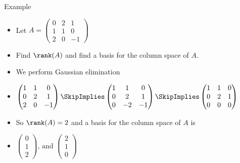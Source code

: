 \documentclass{beamer}
\begin{document}

\begin{frame}{Example}

\begin{itemize}
\item Let $A=
\begin{pmatrix}
0 & 2 & 1 \\
1 & 1 & 0 \\
2 & 0 & -1
\end{pmatrix}
$
\item Find $\rank(A)$ and find a basis for the column space of $A$.
\item We perform Gaussian elimination
\item $
\begin{pmatrix}
1 & 1 & 0 \\
0 & 2 & 1 \\
2 & 0 & -1
\end{pmatrix}
\SkipImplies
\begin{pmatrix}
1 & 1 & 0 \\
0 & 2 & 1 \\
0 & -2 & -1
\end{pmatrix}
\SkipImplies
\begin{pmatrix}
1 & 1 & 0 \\
0 & 2 & 1 \\
0 & 0 & 0
\end{pmatrix}
$
\item So $\rank(A)=2$ and a basis for the column space of $A$ is
\item $
\begin{pmatrix}
0 \\
1 \\
2
\end{pmatrix}
\text{, and }
\begin{pmatrix}
2 \\
1 \\
0
\end{pmatrix}
$
\end{itemize}

\end{frame}


\end{document}
